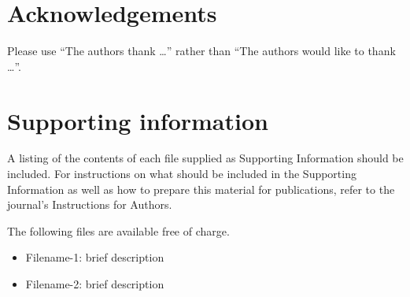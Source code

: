 \documentclass[letterpaper]{article}
\begin{document}
\section*{Acknowledgements}

Please use ``The authors thank \ldots'' rather than ``The authors would like to
thank \ldots''.

\section*{Supporting information}

A listing of the contents of each file supplied as Supporting Information
should be included. For instructions on what should be included in the
Supporting Information as well as how to prepare this material for
publications, refer to the journal's Instructions for Authors.

The following files are available free of charge.
\begin{itemize}
  \item Filename-1: brief description
  \item Filename-2: brief description
\end{itemize}

% 




  
  



\end{document}

